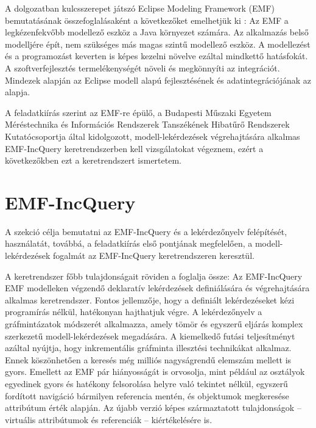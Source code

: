 A dolgozatban kulcsszerepet játszó Eclipse Modeling Framework (\gls{EMF}) bemutatásának összefoglalásaként a következőket emelhetjük ki \cite{EMFFundamentals}:
Az \gls{EMF} a legkézenfekvőbb modellező eszköz a Java környezet számára.
Az alkalmazás belső modelljére épít, nem szükséges más magas szintű modellező eszköz.
A modellezést és a programozást keverten is képes kezelni növelve ezáltal mindkettő hatásfokát.
A szoftverfejlesztés termelékenységét növeli és megkönnyíti az integrációt.
Mindezek alapján az Eclipse modell alapú fejlesztésének és adatintegrációjának az alapja. 

A feladatkiírás szerint az \gls{EMF}-re épülő, a Budapesti Műszaki Egyetem Méréstechnika és Információs Rendszerek Tanszékének Hibatűrő Rendszerek Kutatócsoportja által kidolgozott, modell-lekérdezések végrehajtására alkalmas EMF-IncQuery keretrendszerben kell vizsgálatokat végeznem, ezért a következőkben ezt a keretrendszert ismertetem.


\section{EMF-IncQuery}\label{sect:IncQuery}

A szekció célja bemutatni az EMF-IncQuery és a lekérdezőnyelv felépítését, használatát, továbbá, a feladatkiírás első pontjának megfelelően, a modell-lekérdezések fogalmát az EMF-IncQuery keretrendszeren keresztül.

A keretrendszer főbb tulajdonságait röviden a \cite{EMFIncQuery} foglalja össze:
Az EMF-IncQuery \gls{EMF} modelleken végzendő deklaratív lekérdezések definiálására és végrehajtására alkalmas keretrendszer.
Fontos jellemzője, hogy a definiált lekérdezéseket kézi programírás nélkül, hatékonyan hajthatjuk végre.
A lekérdezőnyelv a gráfmintázatok módszerét alkalmazza, amely tömör és egyszerű eljárás komplex szerkezetű modell-lekérdezések megadására.
A kiemelkedő futási teljesítményt azáltal nyújtja, hogy inkrementális gráfminta illesztési technikákat alkalmaz.
Ennek köszönhetően a keresés még milliós nagyságrendű elemszám mellett is gyors.
Emellett az \gls{EMF} pár hiányosságát is orvosolja, mint például az osztályok egyedinek gyors és hatékony felsorolása helyre való tekintet nélkül, egyszerű fordított navigáció bármilyen referencia mentén, és objektumok megkeresése attribútum érték alapján.
Az újabb verzió képes származtatott tulajdonságok -- virtuális attribútumok és referenciák -- kiértékelésére is.

